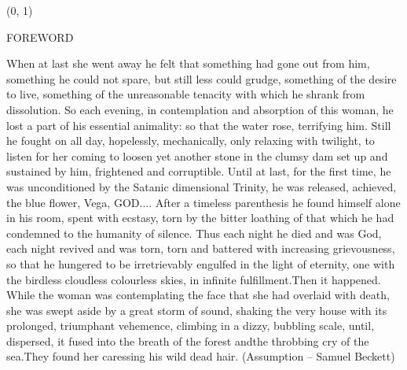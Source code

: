\documentclass[11pt]{article}
\begin{document}
\begin{textblock}{23}(0, 1)
\begin{center}
\huge FOREWORD
\end{center}
\end{textblock}

\vspace*{0.25\baselineskip}

\begingroup
\begin{center}
When at last she went away he felt that something had gone out from him, something he could not spare, but still less could grudge, something of the desire to live, something of the unreasonable tenacity with which he shrank from dissolution. So each evening, in contemplation and absorption of this woman, he lost a part of his essential animality: so that the water rose, terrifying him. Still he fought on all day, hopelessly, mechanically, only relaxing with twilight, to listen for her coming to loosen yet another stone in the clumsy dam set up and sustained by him, frightened and corruptible. Until at last, for the first time, he was unconditioned by the Satanic dimensional Trinity, he was released, achieved, the blue flower, Vega, GOD.... After a timeless parenthesis he found himself alone in his room, spent with ecstasy, torn by the bitter loathing of that which he had condemned to the humanity of silence. Thus each night he died and was God, each night revived and was torn, torn and battered with increasing grievousness, so that he hungered to be irretrievably engulfed in the light of eternity, one with the birdless cloudless colourless skies, in infinite fulfillment.Then it happened. While the woman was contemplating the face that she had overlaid with death, she was swept aside by a great storm of sound, shaking the very house with its prolonged, triumphant vehemence, climbing in a dizzy, bubbling scale, until, dispersed, it fused into the breath of the forest andthe throbbing cry of the sea.They found her caressing his wild dead hair.
\rightskip\leftskip
\phantom{text} \hfill (Assumption -- Samuel Beckett)
\end{center}
\endgroup

\vspace*{0.25\baselineskip}
\end{document}
